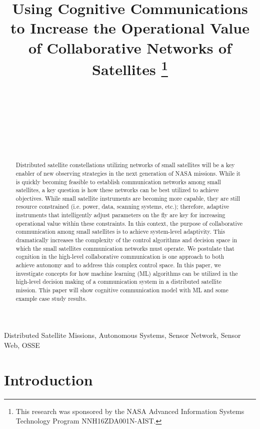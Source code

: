 \documentclass[conference]{IEEEtran}
\title{{Using Cognitive Communications to Increase the Operational Value of
    Collaborative Networks of Satellites}
  \thanks{This research was sponsored by the NASA Advanced Information Systems
    Technology Program NNH16ZDA001N-AIST.}
}
\author{
  \IEEEauthorblockN{Ryan B. Linnabary}
  \IEEEauthorblockA{\thisplace linnabary.24@osu.edu}
  \and
  \IEEEauthorblockN{Andrew J. O'Brien}
  \IEEEauthorblockA{\thisplace obrien.200@osu.edu}
  \and
  \IEEEauthorblockN{Graeme E. Smith}
  \IEEEauthorblockA{\thisplace smith.8347@osu.edu}
  \and
  \IEEEauthorblockN{Christopher Ball}
  \IEEEauthorblockA{\thisplace ball.51@osu.edu}
  \and {~} \and {~~~~~~~~~~~~~~} \and
  \IEEEauthorblockN{Joel T. Johnson}
  \IEEEauthorblockA{\thisplace johnson.1374@osu.edu}
  \and {~~~~~~} \and {~~~~~~}
}
\begin{document}
\maketitle


\begin{abstract}

  Distributed satellite constellations utilizing networks of small satellites will be a key enabler of new observing strategies in the next generation of NASA missions.  While it is quickly becoming feasible to establish communication networks among small satellites, a key question is how these networks can be best utilized to achieve objectives.  While small satellite instruments are becoming more capable, they are still resource constrained (i.e. power, data, scanning systems, etc.); therefore, adaptive instruments that intelligently adjust parameters on the fly are key for increasing operational value within these constraints.  In this context, the purpose of collaborative communication among small satellites is to achieve system-level adaptivity.  This dramatically increases the complexity of the control algorithms and decision space in which the small satellites communication networks must operate.  We postulate that cognition in the high-level collaborative communication is one approach to both achieve autonomy and to address this complex control space.  In this paper, we investigate concepts for how machine learning (ML) algorithms can be utilized in the high-level decision making of a communication system in a distributed satellite mission.  This paper will show cognitive communication model with ML and some example case study results.

\end{abstract}

\begin{IEEEkeywords}

  Distributed Satellite Missions, Autonomous Systems, Sensor Network, Sensor
Web, OSSE

\end{IEEEkeywords}


\section{Introduction}
\label{sec:intro}
\end{document}
